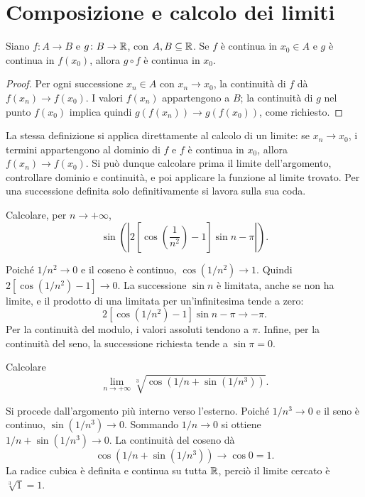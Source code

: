 \section{Composizione e calcolo dei limiti}

\begin{proposizione}
Siano $f\colon A\to B$ e $g\colon B\to\mathbb{R}$, con $A,B\subseteq\mathbb{R}$. Se $f$ è continua in $x_0\in A$ e $g$ è continua in $f(x_0)$, allora $g\circ f$ è continua in $x_0$.
\end{proposizione}
\begin{proof}
Per ogni successione $x_n\in A$ con $x_n\to x_0$, la continuità di $f$ dà $f(x_n)\to f(x_0)$. I valori $f(x_n)$ appartengono a $B$; la continuità di $g$ nel punto $f(x_0)$ implica quindi $g(f(x_n))\to g(f(x_0))$, come richiesto.
\end{proof}

La stessa definizione si applica direttamente al calcolo di un limite: se $x_n\to x_0$, i termini appartengono al dominio di $f$ e $f$ è continua in $x_0$, allora $f(x_n)\to f(x_0)$. Si può dunque calcolare prima il limite dell'argomento, controllare dominio e continuità, e poi applicare la funzione al limite trovato. Per una successione definita solo definitivamente si lavora sulla sua coda.

\begin{esercizio}
Calcolare, per $n\to+\infty$,
\[
\sin\!\left(\left|2\left[\cos\!\left(\frac1{n^2}\right)-1\right]\sin n-\pi\right|\right).
\]
\end{esercizio}
\begin{svolgimento}
Poiché $1/n^2\to0$ e il coseno è continuo, $\cos(1/n^2)\to1$. Quindi $2[\cos(1/n^2)-1]\to0$. La successione $\sin n$ è limitata, anche se non ha limite, e il prodotto di una limitata per un'infinitesima tende a zero:
\[
2[\cos(1/n^2)-1]\sin n-\pi\longrightarrow-\pi.
\]
Per la continuità del modulo, i valori assoluti tendono a $\pi$. Infine, per la continuità del seno, la successione richiesta tende a $\sin\pi=0$.
\end{svolgimento}

\begin{esercizio}
Calcolare
\[
\lim_{n\to+\infty}\sqrt[3]{\cos(1/n+\sin(1/n^3))}.
\]
\end{esercizio}
\begin{svolgimento}
Si procede dall'argomento più interno verso l'esterno. Poiché $1/n^3\to0$ e il seno è continuo, $\sin(1/n^3)\to0$. Sommando $1/n\to0$ si ottiene $1/n+\sin(1/n^3)\to0$. La continuità del coseno dà
\[
\cos(1/n+\sin(1/n^3))\longrightarrow\cos0=1.
\]
La radice cubica è definita e continua su tutta $\mathbb{R}$, perciò il limite cercato è $\sqrt[3]1=1$.
\end{svolgimento}

